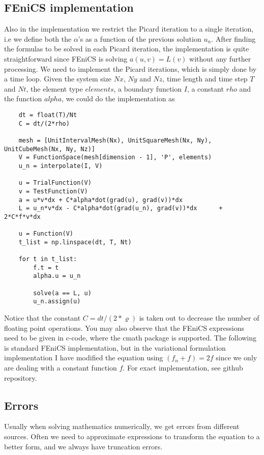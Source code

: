 \documentclass[norsk,a4paper,12pt]{article}
\begin{document}
\subsection{FEniCS implementation}
Also in the implementation we restrict the Picard iteration to a single iteration, i.e we define both the $\alpha$'s as a function of the previous solution $u_n$. After finding the formulas to be solved in each Picard iteration, the implementation is quite straightforward since FEniCS is solving $a(u,v)=L(v)$ without any further processing. We need to implement the Picard iterations, which is simply done by a time loop. Given the system size $Nx$, $Ny$ and $Nz$, time length and time step $T$ and $Nt$, the element type $elements$, a boundary function $I$, a constant $rho$ and the function $alpha$, we could do the implementation as 
\begin{lstlisting}
    dt = float(T)/Nt
    C = dt/(2*rho)

    mesh = [UnitIntervalMesh(Nx), UnitSquareMesh(Nx, Ny), UnitCubeMesh(Nx, Ny, Nz)]
    V = FunctionSpace(mesh[dimension - 1], 'P', elements)
    u_n = interpolate(I, V)

    u = TrialFunction(V)
    v = TestFunction(V)
    a = u*v*dx + C*alpha*dot(grad(u), grad(v))*dx
    L = u_n*v*dx - C*alpha*dot(grad(u_n), grad(v))*dx      + 2*C*f*v*dx
    
    u = Function(V)
    t_list = np.linspace(dt, T, Nt)

    for t in t_list:
        f.t = t
        alpha.u = u_n

        solve(a == L, u) 
        u_n.assign(u)
\end{lstlisting}
Notice that the constant $C = dt/(2*\varrho)$ is taken out to decrease the number of floating point operations. You may also observe that the FEniCS expressions need to be given in c-code, where the cmath package is supported. The following is standard FEniCS implementation, but in the variational formulation implementation I have modified the equation using $(f_n + f) = 2f$ since we only are dealing with a constant function $f$. For exact implementation, see github repository.


\subsection{Errors}
Usually when solving mathematics numerically, we get errors from different sources. Often we need to approximate expressions to transform the equation to a better form, and we always have truncation errors.
\end{document}

